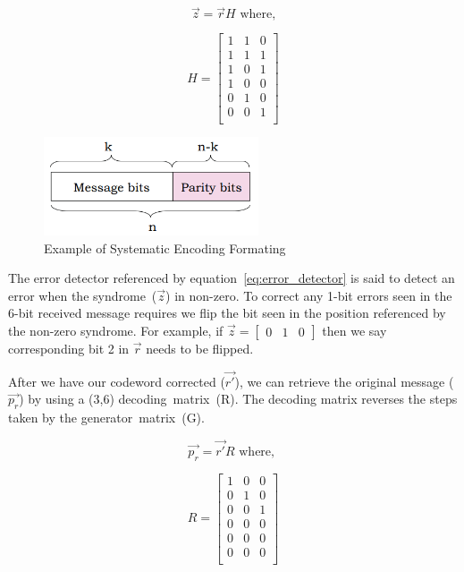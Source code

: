 \documentclass[12pt]{article}
\begin{document}
\begin{equation}
    \vec{z}=\vec{r}H \text{ where,}
    \label{eq:error_detector}
\end{equation}

$$
    H=
    \begin{bmatrix}
        1 & 1 & 0 \\
        1 & 1 & 1 \\
        1 & 0 & 1 \\
        1 & 0 & 0 \\
        0 & 1 & 0 \\
        0 & 0 & 1 \\
    \end{bmatrix}
$$

\begin{figure}[H]
    \centering
    \includegraphics[width=2.5in]{systematic_encoded.PNG}
    \caption{Example of Systematic Encoding Formating
             \cite{Balakrishnan2010}}
\end{figure}

The error detector referenced by equation~\ref{eq:error_detector} is said to 
detect an error when the syndrome~($\vec{z}$) in non-zero. To correct any 
1-bit errors seen in the 6-bit received message requires we flip the bit
seen in the position referenced by the non-zero syndrome. For example,
if $\vec{z}=\begin{bmatrix} 0 & 1 & 0 \end{bmatrix}$ then we say corresponding
bit 2 in $\vec{r}$ needs to be flipped. 

After we have our codeword corrected ($\vec{r'}$), we can retrieve the 
original message ($\vec{p_r}$) by using a (3,6) decoding~matrix~(R). 
The decoding matrix reverses the steps taken by the generator~matrix~(G). 

\begin{equation}
    \vec{p_r}=\vec{r'}R \text{ where, }
    \label{eq:decoder}   
\end{equation}

$$
    R=
    \begin{bmatrix}
        1 & 0 & 0 \\
        0 & 1 & 0 \\
        0 & 0 & 1 \\
        0 & 0 & 0 \\
        0 & 0 & 0 \\
        0 & 0 & 0 \\
    \end{bmatrix}
$$
\end{document}
